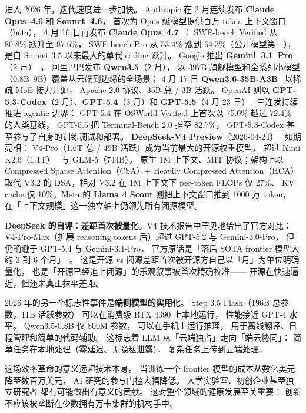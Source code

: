 进入 2026 年，迭代速度进一步加快。
Anthropic 在 2 月连续发布 \textbf{Claude Opus~4.6} 和 \textbf{Sonnet~4.6}，
首次为 Opus 级模型提供百万 token 上下文窗口（beta），
4 月 16 日再发布 \textbf{Claude Opus~4.7}~\cite{anthropicopus47}：
SWE-bench Verified 从 80.8\% 跃升至 87.6\%，
SWE-bench Pro 从 53.4\% 涨到 64.3\%（公开模型第一），
是自 Sonnet 3.5 以来最大的单代 coding 跃升。
Google 推出 \textbf{Gemini~3.1~Pro}（2 月）~\cite{googlegemini31}，
阿里巴巴发布 \textbf{Qwen3.5}（2 月），
以 397B 旗舰模型和全系列小模型（0.8B--9B）覆盖从云端到边缘的全场景；
4 月 17 日 \textbf{Qwen3.6-35B-A3B}~\cite{qwen36moe} 以稀疏 MoE 接力开源，
Apache 2.0 协议、35B 总 / 3B 活跃。
OpenAI 则以 \textbf{GPT-5.3-Codex}（2 月）、\textbf{GPT-5.4}（3 月）和
\textbf{GPT-5.5}（4 月 23 日）~\cite{openaigpt54} 三连发持续推进 agentic 边界：
GPT-5.4 在 OSWorld-Verified 上首次以 75.0\% 越过 72.4\% 的人类基线，
GPT-5.5 把 Terminal-Bench 2.0 推至 82.7\%，
GPT-5.3-Codex 甚至参与了自身的训练调试和部署。
\textbf{DeepSeek-V4 Preview}（2026-04-24）~\cite{deepseekv4} 如期亮相：
V4-Pro（1.6T 总 / 49B 活跃）成为当前最大的开源权重模型，
超过 Kimi K2.6（1.1T）~\cite{kimik26} 与 GLM-5（744B），
原生 1M 上下文、MIT 协议；架构上以
Compressed Sparse Attention（CSA）+ Heavily Compressed Attention（HCA）
取代 V3.2 的 DSA，相对 V3.2 在 1M 上下文下 per-token FLOPs 仅 27\%、
KV cache 仅 10\%。Meta 的 \textbf{Llama 4 Scout} 则把上下文窗口推到 1000 万 token，
在「上下文规模」这一独立轴上仍领先所有闭源模型。

\textbf{DeepSeek 的自评：差距首次被量化}。V4 技术报告中罕见地给出了官方对比：
V4-Pro-Max（扩展 reasoning tokens 后）超过 GPT-5.2 与 Gemini-3.0-Pro，
但仍稍逊于 GPT-5.4 与 Gemini-3.1-Pro，
官方原话是「落后 SOTA frontier 模型大约 3 到 6 个月」~\cite{deepseekv4}。
这是开源 vs 闭源差距首次被开源方自己以「月」为单位明确量化，
也是「开源已经追上闭源」的乐观叙事被首次精确校准——
开源在快速逼近，但还未真正抹平差距。

2026 年的另一个标志性事件是\textbf{端侧模型的实用化}。
Step 3.5 Flash（196B 总参数，11B 活跃参数）
可以在消费级 RTX 4090 上本地运行，
性能接近 GPT-4 水平。
Qwen3.5-0.8B 仅 800M 参数，
可以在手机上运行推理，
用于离线翻译、日程管理和简单的代码辅助。
这标志着 LLM 从「云端独占」走向「端云协同」：
简单任务在本地处理（零延迟、无隐私泄露），
复杂任务上传到云端处理。

这场效率革命的意义远超技术本身。
当训练一个 frontier 模型的成本从数亿美元降至数百万美元，
AI 研究的参与门槛大幅降低。
大学实验室、初创企业甚至独立研究者
都有可能做出有意义的贡献。
这对整个领域的健康发展至关重要：
创新不应该被垄断在少数拥有万卡集群的机构手中。

